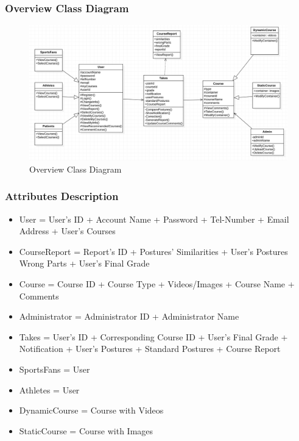 \documentclass[16pt]{scrreprt}
\begin{document}
\subsubsection{Overview Class Diagram}
\begin{figure}[H]
\centering
\includegraphics[width=1.1\textwidth]{figures/classDiagram.png}
\caption{Overview Class Diagram}
\label{fig:classdia}

\end{figure}
\subsubsection{Attributes Description}
\begin{itemize}
    \item User = User's ID + Account Name + Password + Tel-Number + Email Address + User's Courses
    \item CourseReport = Report's ID + Postures' Similarities + User's Postures Wrong Parts + User's Final Grade
    \item Course = Course ID + Course Type + Videos/Images + Course Name + Comments
    \item Administrator = Administrator ID + Administrator Name
    \item Takes = User's ID + Corresponding Course ID + User's Final Grade + Notification + User's Postures + Standard Postures + Course Report
    \item SportsFans = User
    \item Athletes  = User
    \item DynamicCourse = Course with Videos
    \item StaticCourse = Course with Images
\end{itemize}
\end{document}
